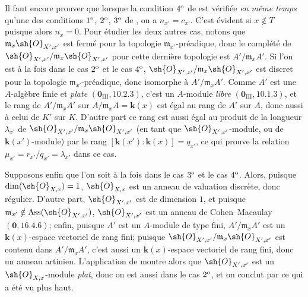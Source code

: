 \begin{env}[21.10.11]
Il faut encore prouver que lorsque la condition $4\textsuperscript{o}$ de  est vérifiée \emph{en même temps} qu'une des conditions $1\textsuperscript{o}$, $2\textsuperscript{o}$, $3\textsuperscript{o}$ de , on a $n_{x'}=c_{x'}$.
C'est évident si $x\notin T$ puisque alors $n_x=0$.
Pour étudier les deux autres cas, notons que $\mathfrak{m}_x\sh{O}_{X',x'}$ est fermé pour la topologie $\mathfrak{m}_{x'}$-préadique, donc le complété de $\sh{O}_{X',x'}/\mathfrak{m}_x\sh{O}_{X',x'}$ pour cette dernière topologie est $A'/\mathfrak{m}_xA'$.
Si l'on est à la fois dans le cas $2\textsuperscript{o}$ et le cas $4\textsuperscript{o}$, $\sh{O}_{X',x'}/\mathfrak{m}_x\sh{O}_{X',x'}$ est discret pour la topologie $\mathfrak{m}_{x'}$-préadique, donc isomorphe à $A'/\mathfrak{m}_xA'$.
Comme $A'$ est une $A$-algèbre finie et \emph{plate} $(\mathbf{0}_{\mathrm{III}},10.2.3)$, c'est un $A$-module \emph{libre} $(\mathbf{0}_{\mathrm{III}},10.1.3)$, et le rang de $A'/\mathfrak{m}_xA'$ sur $A/\mathfrak{m}_xA=\boldsymbol{k}(x)$ est égal au rang de $A'$ sur $A$, donc aussi à celui de $K'$ sur $K$.
D'autre part ce rang est aussi égal au produit de la longueur $\lambda_{x'}$ de $\sh{O}_{X',x'}/\mathfrak{m}_x\sh{O}_{X',x'}$ (en tant que $\sh{O}_{X',x'}$-module, ou de $\boldsymbol{k}(x')$-module) par le rang $[\boldsymbol{k}(x'): \boldsymbol{k}(x)]=q_{x'}$, ce qui prouve la relation $\mu_{x'}=r_{x'}/q_{x'}=\lambda_{x'}$ dans ce cas.

Supposons enfin que l'on soit à la fois dans le cas $3\textsuperscript{o}$ et le cas $4\textsuperscript{o}$.
Alors, puisque $\dim(\sh{O}_{X,x})=1$, $\sh{O}_{X,x}$ est un anneau de valuation discrète, donc régulier.
D'autre part, $\sh{O}_{X',x'}$ est de dimension $1$, et puisque $\mathfrak{m}_{x'}\notin\operatorname{Ass}(\sh{O}_{X',x'})$, $\sh{O}_{X',x'}$ est un anneau de Cohen--Macaulay $(\mathbf{0},16.4.6)$;
enfin, puisque $A'$ est un $A$-module de type fini, $A'/\mathfrak{m}_xA'$ est un $\boldsymbol{k}(x)$-espace vectoriel de rang fini;
puisque $\sh{O}_{X',x'}/\mathfrak{m}_x\sh{O}_{X',x'}$ est contenu dans $A'/\mathfrak{m}_xA'$, c'est aussi un $\boldsymbol{k}(x)$-espace vectoriel de rang fini, donc un anneau artinien.
L'application de  montre alors que $\sh{O}_{X',x'}$ est un $\sh{O}_{X,x}$-module \emph{plat}, donc on est aussi dans le cas $2\textsuperscript{o}$, et on conclut par ce qui a été vu plus haut.


\end{env}
